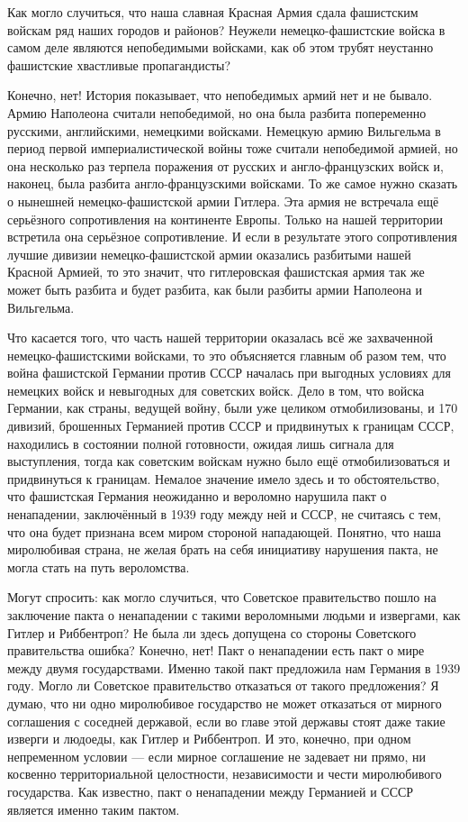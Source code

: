 \documentclass[12pt, a4paper, openany]{book}
\begin{document}
Как могло случиться, что наша славная Красная Армия сдала фашистским войскам ряд наших городов и районов? Неужели немецко-фашистские войска в самом деле являются непобедимыми войсками, как об этом трубят неустанно фашистские хвастливые пропагандисты?

Конечно, нет! История показывает, что непобедимых армий нет и не бывало. Армию Наполеона считали непобедимой, но она была разбита попеременно русскими, английскими, немецкими войсками. Немецкую армию Вильгельма в период первой империалистической войны тоже считали непобедимой армией, но она несколько раз терпела поражения от русских и англо-французских войск и, наконец, была разбита англо-французскими войсками. То же самое нужно сказать о нынешней немецко-фашистской армии Гитлера. Эта армия не встречала ещё серьёзного сопротивления на континенте Европы. Только на нашей территории встретила она серьёзное сопротивление. И если в результате этого сопротивления лучшие дивизии немецко-фашистской армии оказались разбитыми нашей Красной Армией, то это значит, что гитлеровская фашистская армия так же может быть разбита и будет разбита, как были разбиты армии Наполеона и Вильгельма.

Что касается того, что часть нашей территории оказалась всё же захваченной немецко-фашистскими войсками, то это объясняется главным об разом тем, что война фашистской Германии против СССР началась при выгодных условиях для немецких войск и невыгодных для советских войск. Дело в том, что войска Германии, как страны, ведущей войну, были уже целиком отмобилизованы, и 170 дивизий, брошенных Германией против СССР и придвинутых к границам СССР, находились в состоянии полной готовности, ожидая лишь сигнала для выступления, тогда как советским войскам нужно было ещё отмобилизоваться и придвинуться к границам. Немалое значение имело здесь и то обстоятельство, что фашистская Германия неожиданно и вероломно нарушила пакт о ненападении, заключённый в 1939 году между ней и СССР, не считаясь с тем, что она будет признана всем миром стороной нападающей. Понятно, что наша миролюбивая страна, не желая брать на себя инициативу нарушения пакта, не могла стать на путь вероломства.

Могут спросить: как могло случиться, что Советское правительство пошло на заключение пакта о ненападении с такими вероломными людьми и извергами, как Гитлер и Риббентроп? Не была ли здесь допущена со стороны Советского правительства ошибка? Конечно, нет! Пакт о ненападении есть пакт о мире между двумя государствами. Именно такой пакт предложила нам Германия в 1939 году. Могло ли Советское правительство отказаться от такого предложения? Я думаю, что ни одно миролюбивое государство не может отказаться от мирного соглашения с соседней державой, если во главе этой державы стоят даже такие изверги и людоеды, как Гитлер и Риббентроп. И это, конечно, при одном непременном условии — если мирное соглашение не задевает ни прямо, ни косвенно территориальной целостности, независимости и чести миролюбивого государства. Как известно, пакт о ненападении между Германией и СССР является именно таким пактом.
\end{document}
